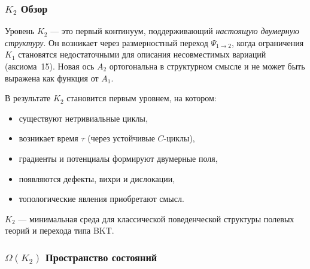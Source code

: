 

\subsubsection{\texorpdfstring{$K_2$}{K_2} Обзор}
\label{sec:k2-overview}

Уровень $K_2$ — это первый континуум, поддерживающий
\emph{настоящую двумерную структуру}. Он возникает через
размерностный переход
$\Psi_{1\to2}$, когда ограничения $K_1$ становятся недостаточными для
описания несовместимых вариаций (аксиома~15). Новая ось $A_2$ ортогональна
в структурном смысле и не может быть выражена как функция от $A_1$.

В результате $K_2$ становится первым уровнем, на котором:
\begin{itemize}
    \item существуют нетривиальные циклы,
    \item возникает время $\tau$ (через устойчивые $C$-циклы),
    \item градиенты и потенциалы формируют двумерные поля,
    \item появляются дефекты, вихри и дислокации,
    \item топологические явления приобретают смысл.
\end{itemize}

$K_2$ — минимальная среда для классической поведенческой
структуры полевых теорий и перехода типа BKT.

\subsubsection{\texorpdfstring{$\Omega(K_2)$}{\Omega(K_2)} Пространство состояний}

